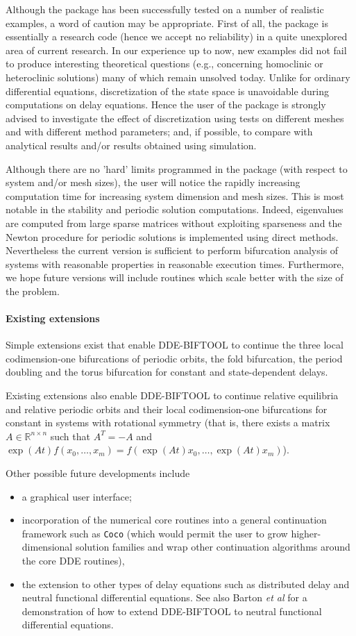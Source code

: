 \documentclass[10pt]{scrartcl}
\newcommand{\DDEBIFCODE}{\textsc{DDE-BIFTOOL}}
\newcommand{\RR}{\mathbb{R}}
\begin{document}
{Although
the package has been successfully tested on a number of realistic examples,
a word of caution may be appropriate. First of all, the package
is essentially a research code (hence we accept no
reliability) in a quite unexplored area of current
research. In our experience up to now, 
new examples did not fail to produce
interesting theoretical questions (e.g., concerning homoclinic
or heteroclinic solutions) many of which
remain unsolved today. 
Unlike for ordinary differential equations, discretization
of the state space is unavoidable during computations on
delay equations. Hence the user of the package is 
strongly advised 
to investigate the effect of discretization using tests on different
meshes and with different method parameters; and, if
possible, to compare with analytical results and/or results obtained
using simulation.

Although there are no 'hard' limits programmed in the package (with
respect to system and/or mesh sizes), the user will notice the rapidly
increasing computation time for increasing system dimension and mesh
sizes.  This is most notable in the stability and periodic solution
computations.  Indeed, eigenvalues are computed from large sparse
matrices without exploiting sparseness and the Newton procedure for
periodic solutions is implemented using direct methods.  Nevertheless
the current version is sufficient to perform bifurcation analysis of
systems with reasonable properties in reasonable execution times.
Furthermore, we hope future versions will include routines which scale
better with the size of the problem.

\paragraph{Existing extensions}
Simple extensions exist that enable \DDEBIFCODE{} to continue the
three local co\-dim\-ension-one bifurcations of periodic orbits, the fold
bifurcation, the period doubling and the torus bifurcation for
constant and state-dependent delays.

Existing extensions also enable \DDEBIFCODE{} to continue relative equilibria
and relative periodic orbits and their local codimension-one
bifurcations for constant in systems with rotational symmetry (that
is, there exists a matrix $A\in\RR^{n\times n}$ such that $A^T=-A$ and
$\exp(At)f(x_0,\ldots,x_m)=f(\exp(At)x_0,\ldots,\exp(At)x_m)$).

Other possible future developments include
\begin{itemize}
\item a graphical user interface;
\item incorporation of the numerical core
  routines into a general continuation framework such as \texttt{Coco}
  \cite{DS13} (which would permit the user to grow higher-dimensional
  solution families and wrap other continuation algorithms around the
  core DDE routines),
\item the extension to other types of delay equations such as
  distributed delay and neutral functional differential equations. See
  also Barton \emph{et al} \cite{Barton06} for a demonstration of how
  to extend \DDEBIFCODE{} to neutral functional differential
  equations.
\end{itemize}
}
\end{document}
